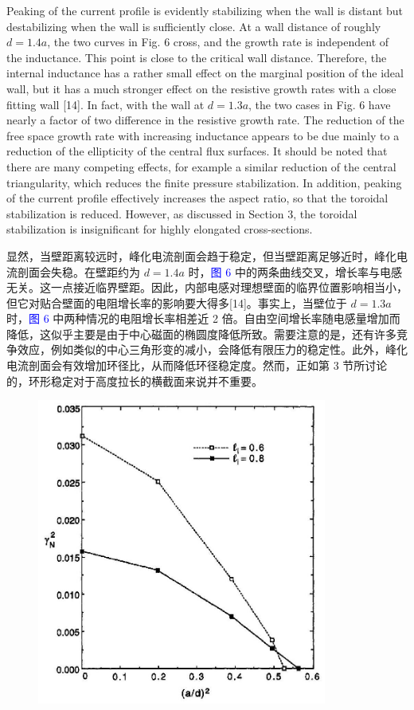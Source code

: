 \documentclass[utf8]{ctexart}
\newcommand\enzhbox[2]{
  	\quad\par \begin{paracol}{2} \colseprulecolor{black} 
  		\begin{spacing}{1.0}
  			\footnotesize  #1
  		\end{spacing}
  		\switchcolumn[1] 
  		#2
  	\end{paracol} \quad\par
  }
\begin{document}
\begin{sloppypar}
 
\enzhbox{  Peaking of the current profile is evidently stabilizing when the wall is distant but destabilizing when the wall is sufficiently close. At a wall distance of roughly $d=1.4 a$, the two curves in Fig. 6 cross, and the growth rate is independent of the inductance. This point is close to the critical wall distance. Therefore, the internal inductance has a rather small effect on the marginal position of the ideal wall, but it has a much stronger effect on the resistive growth rates with a close fitting wall \textcolor{green!50!black}{[14]}. In fact, with the wall at $d=1.3 a$, the two cases in Fig. 6 have nearly a factor of two difference in the resistive growth rate. The reduction of the free space growth rate with increasing inductance appears to be due mainly to a reduction of the ellipticity of the central flux surfaces. It should be noted that there are many competing effects, for example a similar reduction of the central triangularity, which reduces the finite pressure stabilization. In addition, peaking of the current profile effectively increases the aspect ratio, so that the toroidal stabilization is reduced. However, as discussed in Section 3, the toroidal stabilization is insignificant for highly elongated cross-sections.\\}{
显然，当壁距离较远时，峰化电流剖面会趋于稳定，但当壁距离足够近时，峰化电流剖面会失稳。在壁距约为 $d=1.4 a$ 时，\textcolor{blue}{图 6} 中的两条曲线交叉，增长率与电感无关。这一点接近临界壁距。因此，内部电感对理想壁面的临界位置影响相当小，但它对贴合壁面的电阻增长率的影响要大得多\textcolor{green!50!black}{[14]}。事实上，当壁位于 $d=1.3 a$ 时，\textcolor{blue}{图 6} 中两种情况的电阻增长率相差近 2 倍。自由空间增长率随电感量增加而降低，这似乎主要是由于中心磁面的椭圆度降低所致。需要注意的是，还有许多竞争效应，例如类似的中心三角形变的减小，会降低有限压力的稳定性。此外，峰化电流剖面会有效增加环径比，从而降低环径稳定度。然而，正如第 3 节所讨论的，环形稳定对于高度拉长的横截面来说并不重要。}
  \begin{figure}[H]
  	\centering
  	\includegraphics[max width=0.85\textwidth,max height=0.3\textheight]{2025_01_10_a0135324997886412d98g-7}

\end{figure}
\end{sloppypar}
\end{document}
